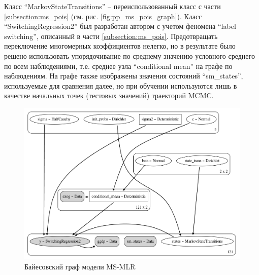 \documentclass[a4paper,14pt]{extreport}
\begin{document}
Класс ``MarkovStateTransitions'' -- переиспользованный класс с части \ref{subsection:ms_pois} (см. рис. \ref{fig:pp_ms_pois_graph}). 
Класс ``SwitchingRegression2'' был разработан автором с учетом феномена ``label switching'', описанный в части \ref{subsection:ms_pois}. Предотвращать переключение многомерных коэффициентов нелегко, но в результате было решено использовать упорядочивание по среднему значению условного среднего по всем наблюдениями, т.е. среднее узла ``conditional mean'' на графе по наблюдениям.
На графе также изображены значения состояний ``sm\_states'', используемые для сравнения далее, но при обучении используются лишь в качестве начальных точек (тестовых значений) траекторий MCMC.

\begin{figure}[H]
	\includegraphics[width=\linewidth]{img/manual/pp_ms_arx_graph_man.png}
	\caption{Байесовский граф модели MS-MLR}
	\label{fig:pp_ms_arx_graph_man}
\end{figure}
\end{document}
